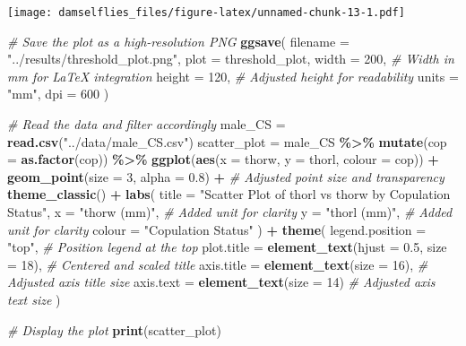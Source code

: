\documentclass[
]{article}
\newenvironment{Shaded}{\begin{snugshade}}{\end{snugshade}}
\newcommand{\AttributeTok}[1]{\textcolor[rgb]{0.13,0.29,0.53}{#1}}
\newcommand{\CommentTok}[1]{\textcolor[rgb]{0.56,0.35,0.01}{\textit{#1}}}
\newcommand{\DecValTok}[1]{\textcolor[rgb]{0.00,0.00,0.81}{#1}}
\newcommand{\FloatTok}[1]{\textcolor[rgb]{0.00,0.00,0.81}{#1}}
\newcommand{\FunctionTok}[1]{\textcolor[rgb]{0.13,0.29,0.53}{\textbf{#1}}}
\newcommand{\NormalTok}[1]{#1}
\newcommand{\OtherTok}[1]{\textcolor[rgb]{0.56,0.35,0.01}{#1}}
\newcommand{\SpecialCharTok}[1]{\textcolor[rgb]{0.81,0.36,0.00}{\textbf{#1}}}
\newcommand{\StringTok}[1]{\textcolor[rgb]{0.31,0.60,0.02}{#1}}
\begin{document}
\texttt{[image: damselflies\_files/figure-latex/unnamed-chunk-13-1.pdf]}

\begin{Shaded}
\begin{Highlighting}[]
\CommentTok{\# Save the plot as a high{-}resolution PNG}
\FunctionTok{ggsave}\NormalTok{(}
  \AttributeTok{filename =} \StringTok{"../results/threshold\_plot.png"}\NormalTok{, }
  \AttributeTok{plot =}\NormalTok{ threshold\_plot, }
  \AttributeTok{width =} \DecValTok{200}\NormalTok{,  }\CommentTok{\# Width in mm for LaTeX integration}
  \AttributeTok{height =} \DecValTok{120}\NormalTok{, }\CommentTok{\# Adjusted height for readability}
  \AttributeTok{units =} \StringTok{"mm"}\NormalTok{,}
  \AttributeTok{dpi =} \DecValTok{600}
\NormalTok{)}
\end{Highlighting}
\end{Shaded}

\begin{Shaded}
\begin{Highlighting}[]
\CommentTok{\# Read the data and filter accordingly}
\NormalTok{male\_CS }\OtherTok{=} \FunctionTok{read.csv}\NormalTok{(}\StringTok{"../data/male\_CS.csv"}\NormalTok{)}
\NormalTok{scatter\_plot }\OtherTok{=}\NormalTok{ male\_CS }\SpecialCharTok{\%\textgreater{}\%}
  \FunctionTok{mutate}\NormalTok{(}\AttributeTok{cop =} \FunctionTok{as.factor}\NormalTok{(cop)) }\SpecialCharTok{\%\textgreater{}\%}
  \FunctionTok{ggplot}\NormalTok{(}\FunctionTok{aes}\NormalTok{(}\AttributeTok{x =}\NormalTok{ thorw, }\AttributeTok{y =}\NormalTok{ thorl, }\AttributeTok{colour =}\NormalTok{ cop)) }\SpecialCharTok{+}
  \FunctionTok{geom\_point}\NormalTok{(}\AttributeTok{size =} \DecValTok{3}\NormalTok{, }\AttributeTok{alpha =} \FloatTok{0.8}\NormalTok{) }\SpecialCharTok{+}  \CommentTok{\# Adjusted point size and transparency}
  \FunctionTok{theme\_classic}\NormalTok{() }\SpecialCharTok{+}
  \FunctionTok{labs}\NormalTok{(}
    \AttributeTok{title =} \StringTok{"Scatter Plot of thorl vs thorw by Copulation Status"}\NormalTok{,}
    \AttributeTok{x =} \StringTok{"thorw (mm)"}\NormalTok{,  }\CommentTok{\# Added unit for clarity}
    \AttributeTok{y =} \StringTok{"thorl (mm)"}\NormalTok{,  }\CommentTok{\# Added unit for clarity}
    \AttributeTok{colour =} \StringTok{"Copulation Status"}
\NormalTok{  ) }\SpecialCharTok{+}
  \FunctionTok{theme}\NormalTok{(}
    \AttributeTok{legend.position =} \StringTok{"top"}\NormalTok{,  }\CommentTok{\# Position legend at the top}
    \AttributeTok{plot.title =} \FunctionTok{element\_text}\NormalTok{(}\AttributeTok{hjust =} \FloatTok{0.5}\NormalTok{, }\AttributeTok{size =} \DecValTok{18}\NormalTok{),  }\CommentTok{\# Centered and scaled title}
    \AttributeTok{axis.title =} \FunctionTok{element\_text}\NormalTok{(}\AttributeTok{size =} \DecValTok{16}\NormalTok{),              }\CommentTok{\# Adjusted axis title size}
    \AttributeTok{axis.text =} \FunctionTok{element\_text}\NormalTok{(}\AttributeTok{size =} \DecValTok{14}\NormalTok{)                }\CommentTok{\# Adjusted axis text size}
\NormalTok{  )}

\CommentTok{\# Display the plot}
\FunctionTok{print}\NormalTok{(scatter\_plot)}
\end{Highlighting}
\end{Shaded}
\end{document}
